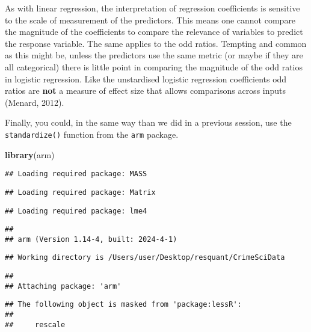 \documentclass[
]{book}
\newenvironment{Shaded}{\begin{snugshade}}{\end{snugshade}}
\newcommand{\FunctionTok}[1]{\textcolor[rgb]{0.13,0.29,0.53}{\textbf{#1}}}
\newcommand{\NormalTok}[1]{#1}
\begin{document}
As with linear regression, the interpretation of regression coefficients is sensitive to the scale of measurement of the predictors. This means one cannot compare the magnitude of the coefficients to compare the relevance of variables to predict the response variable. The same applies to the odd ratios. Tempting and common as this might be, unless the predictors use the same metric (or maybe if they are all categorical) there is little point in comparing the magnitude of the odd ratios in logistic regression. Like the unstardised logistic regression coefficients odd ratios are \textbf{not} a measure of effect size that allows comparisons across inputs (Menard, 2012).

Finally, you could, in the same way than we did in a previous session, use the \texttt{standardize()} function from the \texttt{arm} package.

\begin{Shaded}
\begin{Highlighting}[]
\FunctionTok{library}\NormalTok{(arm)}
\end{Highlighting}
\end{Shaded}

\begin{verbatim}
## Loading required package: MASS
\end{verbatim}

\begin{verbatim}
## Loading required package: Matrix
\end{verbatim}

\begin{verbatim}
## Loading required package: lme4
\end{verbatim}

\begin{verbatim}
## 
## arm (Version 1.14-4, built: 2024-4-1)
\end{verbatim}

\begin{verbatim}
## Working directory is /Users/user/Desktop/resquant/CrimeSciData
\end{verbatim}

\begin{verbatim}
## 
## Attaching package: 'arm'
\end{verbatim}

\begin{verbatim}
## The following object is masked from 'package:lessR':
## 
##     rescale
\end{verbatim}
\end{document}
